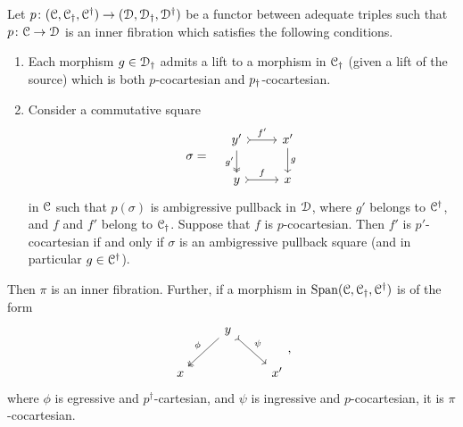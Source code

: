 \documentclass[main.tex]{subfiles}
\begin{document}
\begin{theorem}
  \label{thm:main}
  Let $p\colon (\mathcal{C}, \mathcal{C}_{\dagger}, \mathcal{C}^{\dagger}) \to (\mathcal{D}, \mathcal{D}_{\dagger}, \mathcal{D}^{\dagger})$ be a functor between adequate triples such that $p\colon \mathcal{C} \to \mathcal{D}$ is an inner fibration which satisfies the following conditions.
  \begin{enumerate}
    \item Each morphism $g \in \mathcal{D}_{\dagger}$ admits a lift to a morphism in $\mathcal{C}_{\dagger}$ (given a lift of the source) which is both $p$-cocartesian and $p_{\dagger}$-cocartesian.

    \item Consider a commutative square
      \begin{equation*}
        \sigma = \quad
        \begin{tikzcd}
          y'
          \arrow[r, rightarrowtail, "f'"]
          \arrow[d, two heads, swap, "g'"]
          & x'
          \arrow[d, "g"]
          \\
          y
          \arrow[r, rightarrowtail, "f"]
          & x
        \end{tikzcd}
      \end{equation*}
      in $\mathcal{C}$ such that $p(\sigma)$ is ambigressive pullback in $\mathcal{D}$, where $g'$ belongs to $\mathcal{C}^{\dagger}$, and $f$ and $f'$ belong to $\mathcal{C}_{\dagger}$. Suppose that $f$ is $p$-cocartesian. Then $f'$ is $p'$-cocartesian if and only if $\sigma$ is an ambigressive pullback square (and in particular $g \in \mathcal{C}^{\dagger}$).
  \end{enumerate}
  Then $\pi$ is an inner fibration. Further, if a morphism in $\mathrm{Span}(\mathcal{C}, \mathcal{C}_{\dagger}, \mathcal{C}^{\dagger})$ is of the form
  \begin{equation*}
    \begin{tikzcd}
      & y
      \arrow[dl, two heads, swap, "\phi"]
      \arrow[dr, rightarrowtail, "\psi"]
      \\
      x
      && x'
    \end{tikzcd},
  \end{equation*}
  where $\phi$ is egressive and $p^{\dagger}$-cartesian, and $\psi$ is ingressive and $p$-cocartesian, it is $\pi$-cocartesian.%
\end{theorem}
\end{document}
